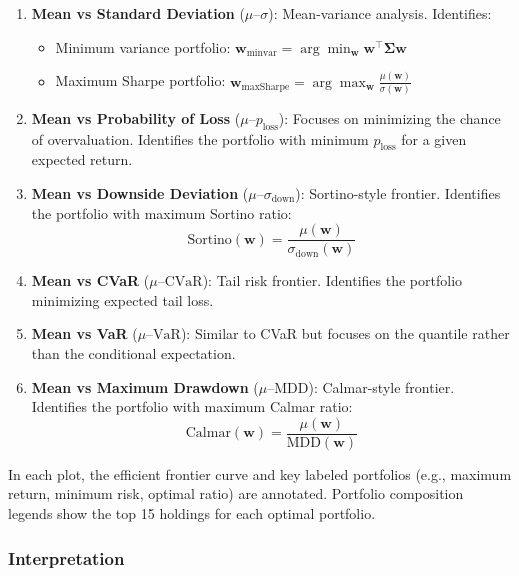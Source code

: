 \begin{enumerate}
  \item \textbf{Mean vs Standard Deviation} ($\mu$--$\sigma$):
  Mean-variance analysis. Identifies:
  \begin{itemize}
    \item Minimum variance portfolio: $\mathbf{w}_{\text{minvar}} = \arg\min_{\mathbf{w}} \mathbf{w}^\top \mathbf{\Sigma} \mathbf{w}$
    \item Maximum Sharpe portfolio: $\mathbf{w}_{\text{maxSharpe}} = \arg\max_{\mathbf{w}} \frac{\mu(\mathbf{w})}{\sigma(\mathbf{w})}$
  \end{itemize}

  \item \textbf{Mean vs Probability of Loss} ($\mu$--$p_{\text{loss}}$):
  Focuses on minimizing the chance of overvaluation. Identifies the portfolio with minimum $p_{\text{loss}}$ for a given expected return.

  \item \textbf{Mean vs Downside Deviation} ($\mu$--$\sigma_{\text{down}}$):
  Sortino-style frontier. Identifies the portfolio with maximum Sortino ratio:
  \[
  \text{Sortino}(\mathbf{w}) = \frac{\mu(\mathbf{w})}{\sigma_{\text{down}}(\mathbf{w})}
  \]

  \item \textbf{Mean vs CVaR} ($\mu$--$\text{CVaR}$):
  Tail risk frontier. Identifies the portfolio minimizing expected tail loss.

  \item \textbf{Mean vs VaR} ($\mu$--$\text{VaR}$):
  Similar to CVaR but focuses on the quantile rather than the conditional expectation.

  \item \textbf{Mean vs Maximum Drawdown} ($\mu$--$\text{MDD}$):
  Calmar-style frontier. Identifies the portfolio with maximum Calmar ratio:
  \[
  \text{Calmar}(\mathbf{w}) = \frac{\mu(\mathbf{w})}{\text{MDD}(\mathbf{w})}
  \]
\end{enumerate}

In each plot, the efficient frontier curve and key labeled portfolios (e.g., maximum return, minimum risk, optimal ratio) are annotated. Portfolio composition legends show the top 15 holdings for each optimal portfolio.

\subsubsection{Interpretation}

